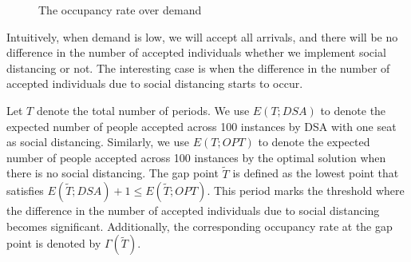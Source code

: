 
\begin{figure}[h]
  \centering
  \caption{The occupancy rate over demand}
  \label{Fig.lable}
\end{figure}

Intuitively, when demand is low, we will accept all arrivals, and there will be no difference in the number of accepted individuals whether we implement social distancing or not. The interesting case is when the difference in the number of accepted individuals due to social distancing starts to occur.

Let $T$ denote the total number of periods. We use $E(T; DSA)$ to denote the expected number of people accepted across 100 instances by DSA with one seat as social distancing. Similarly, we use $E(T; OPT)$ to denote the expected number of people accepted across 100 instances by the optimal solution when there is no social distancing. The gap point $\tilde{T}$ is defined as the lowest point that satisfies $E(\tilde{T}; DSA)+1 \leq E(\tilde{T}; OPT)$. This period marks the threshold where the difference in the number of accepted individuals due to social distancing becomes significant. Additionally, the corresponding occupancy rate at the gap point is denoted by $\Gamma(\tilde{T})$.

